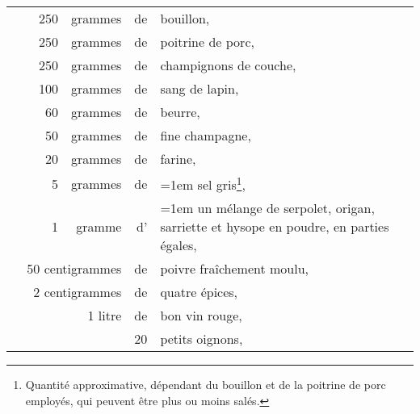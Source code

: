 \footnotesize
\begin{longtable}{rrrrrp{16em}}
  & \hspace{2em} & 250 & grammes & de & bouillon,                                                         \\
  & \hspace{2em} & 250 & grammes & de & poitrine de porc,                                                 \\
  & \hspace{2em} & 250 & grammes & de & champignons de couche,                                            \\
  & \hspace{2em} & 100 & grammes & de & sang de lapin,                                                    \\
  & \hspace{2em} &  60 & grammes & de & beurre,                                                           \\
  & \hspace{2em} &  50 & grammes & de & fine champagne,                                                   \\
  & \hspace{2em} &  20 & grammes & de & farine,                                                           \\
  & \hspace{2em} &   5 & grammes & de & \hangindent=1em sel gris\footnote{Quantité approximative,
                                        dépendant du bouillon et de la poitrine de porc employés,
                                        qui peuvent être plus ou moins salés.},                           \\
  & \hspace{2em} &   1 & gramme  & d' & \hangindent=1em un mélange de serpolet, origan, sarriette et
                                        hysope en poudre, en parties égales,                              \\
  & \multicolumn{3}{r}{50 centigrammes} & de & poivre fraîchement moulu,                                  \\
  & \multicolumn{3}{r}{ 2 centigrammes} & de & quatre épices,                                             \\
  & \hspace{2em} &     & 1 litre & de & bon vin rouge,                                                    \\
  & \hspace{2em} &     &         & 20 & petits oignons,                                                   \\

\end{longtable}
